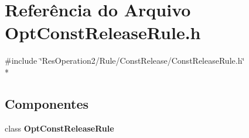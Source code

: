 \section{Referência do Arquivo Opt\+Const\+Release\+Rule.\+h}
\label{_opt_const_release_rule_8h}
{\ttfamily \#include \char`\"{}Res\+Operation2/\+Rule/\+Const\+Release/\+Const\+Release\+Rule.\+h\char`\"{}}\\*
\subsection*{Componentes}
\begin{DoxyCompactItemize}
\item 
class {\bf Opt\+Const\+Release\+Rule}
\end{DoxyCompactItemize}
